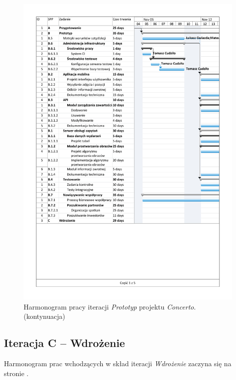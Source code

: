 \documentclass[10pt]{dokument-ppi}
\begin{document}
\begin{figure}[p]
    \ContinuedFloat
    \includegraphics[trim=1.2cm 1.2cm 1.2cm 1.2cm, page=5, width=\textwidth]{./figury/harmonogram-pracy-B-prototyp}
    \caption[]{Harmonogram pracy iteracji \emph{Prototyp} projektu \emph{Concerto}. (kontynuacja)}
\end{figure}

\subsection{Iteracja C -- Wdrożenie}

Harmonogram prac wchodzących w skład iteracji \emph{Wdrożenie}
zaczyna się na stronie \pageref{fig:iteracja-wdrozenie}.
\end{document}
